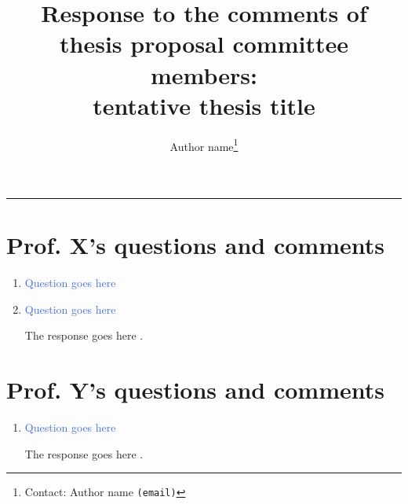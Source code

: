 \documentclass[12pt,letterpaper]{article}
\def\TitleFont{\Large}                      %
\newcommand{\question}{\textcolor{RoyalBlue}}
\numberwithin{equation}{section}        %
\begin{document}

\title{\vspace{-1.5\baselineskip} \TitleFont{Response to the comments of thesis proposal committee members: \\
tentative thesis title}}

\author[]{Author name\footnote{Contact: Author name \texttt{(email)}}} 


\date{}
%
\maketitle 
\vspace{-\baselineskip} \hrule


\section{Prof. X's questions and comments}

\begin{enumerate} [label=\textcolor{RoyalBlue}{\arabic*.},leftmargin=2.5\baselineskip, itemsep=\baselineskip,parsep=\baselineskip]

\item \question{Question goes here}

\Blindtext[2]

\item \question{Question goes here}

The response goes here \cite{dirac}.



\end{enumerate}




\clearpage
\section{Prof. Y's questions and comments}

\begin{enumerate} [label=\textcolor{RoyalBlue}{\arabic*.},leftmargin=2.5\baselineskip, itemsep=\baselineskip,parsep=\baselineskip]

\item \question{Question goes here}

The response goes here \cite{einstein}.


\end{enumerate}
\end{document}
